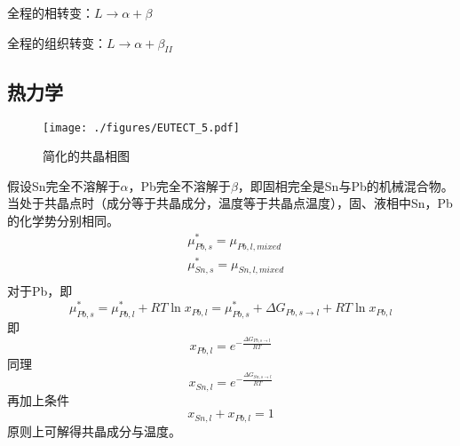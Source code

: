 全程的相转变：$L \rightarrow \alpha+\beta$

全程的组织转变：$L \rightarrow \alpha+ \beta_{II}$

\subsection{热力学}
\begin{figure}[ht]
\centering
\texttt{[image: ./figures/EUTECT\_5.pdf]}
\caption{简化的共晶相图} \label{EUTECT_fig5}
\end{figure}
假设Sn完全不溶解于$\alpha$，Pb完全不溶解于$\beta$，即固相完全是Sn与Pb的机械混合物。当处于共晶点时（成分等于共晶成分，温度等于共晶点温度），固、液相中Sn，Pb的化学势分别相同。
\begin{align}
&\mu_{Pb,s}^*=\mu_{Pb,l,mixed}\\
&\mu_{Sn,s}^*=\mu_{Sn,l,mixed}\\
\end{align}
对于Pb，即
$$\mu_{Pb,s}^*=\mu_{Pb,l}^*+RT \ln x_{Pb,l}=\mu_{Pb,s}^*+\Delta G_{Pb, s\rightarrow l}+RT \ln x_{Pb,l}$$
即
\begin{equation}
x_{Pb,l}=e^{-\frac{\Delta G_{Pb, s\rightarrow l}}{RT}}
\end{equation}
同理
\begin{equation}
x_{Sn,l}=e^{-\frac{\Delta G_{Sn, s\rightarrow l}}{RT}}
\end{equation}
再加上条件
\begin{equation}
x_{Sn,l}+x_{Pb,l}=1
\end{equation}
原则上可解得共晶成分与温度。
